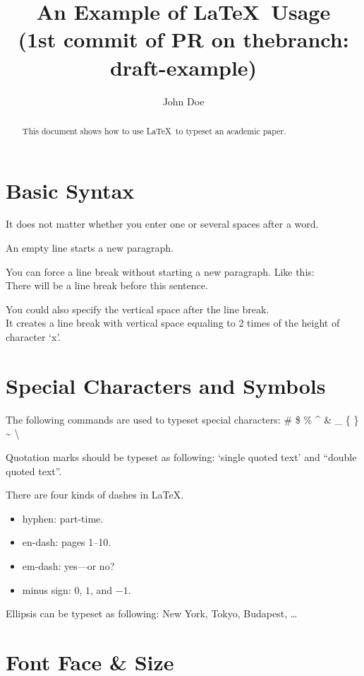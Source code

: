 \documentclass[conference]{IEEEtran}
\title{An Example of \LaTeX~Usage \\ (1st commit of PR on thebranch: draft-example)}
\author{John Doe}
\begin{document}
\maketitle

\begin{abstract}
  This document shows how to use \LaTeX~to typeset an academic paper.
\end{abstract}

\section{Basic Syntax}

It does not matter whether
you enter one or several
spaces        after a word.

An empty line starts a new
paragraph.

You can force a line break without starting a new paragraph. Like this: \\
There will be a line break before this sentence.

You could also specify the vertical space after the line break. \\ [2ex]
It creates a line break with vertical space equaling to 2 times of the height of character `x'.

\section{Special Characters and Symbols}

The following commands are used to typeset special characters:
\# \$ \% \^{} \& \_ \{ \} \~{} \textbackslash

Quotation marks should be typeset as following: `single quoted text' and ``double quoted text''.

There are four kinds of dashes in \LaTeX{}.
\begin{itemize}
  \item hyphen: part-time.
  \item en-dash: pages 1--10.
  \item em-dash: yes---or no?
  \item minus sign: $0$, $1$, and $-1$.
\end{itemize}

Ellipsis can be typeset as following: New York, Tokyo, Budapest, \ldots

\section{Font Face \& Size}
\end{document}
